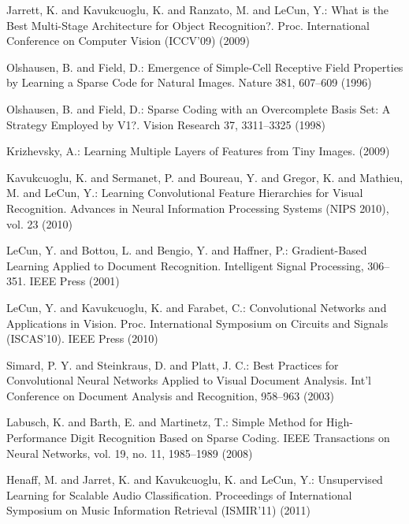 \documentclass[runningheads,a4paper]{llncs}
\begin{document}
\begin{thebibliography}{4}

 Jarrett, K. and Kavukcuoglu, K. and Ranzato, M. and LeCun, Y.: What is the Best Multi-Stage Architecture for Object Recognition?. Proc. International Conference on Computer Vision (ICCV'09) (2009)

 Olshausen, B. and Field, D.: Emergence of Simple-Cell Receptive Field Properties by Learning a Sparse Code for Natural Images. Nature 381, 607--609 (1996)

 Olshausen, B. and Field, D.: Sparse Coding with an Overcomplete Basis Set: A Strategy Employed by V1?. Vision Research 37, 3311--3325 (1998)

 Krizhevsky, A.: Learning Multiple Layers of Features from Tiny Images. (2009)

 Kavukcuoglu, K. and Sermanet, P. and Boureau, Y. and Gregor, K. and Mathieu, M. and LeCun, Y.: Learning Convolutional Feature Hierarchies for Visual Recognition. Advances in Neural Information Processing Systems (NIPS 2010), vol. 23 (2010)

 LeCun, Y. and Bottou, L. and Bengio, Y. and Haffner, P.: Gradient-Based Learning Applied to Document Recognition. Intelligent Signal Processing, 306--351. IEEE Press (2001)

 LeCun, Y. and Kavukcuoglu, K. and Farabet, C.: Convolutional Networks and Applications in Vision. Proc. International Symposium on Circuits and Signals (ISCAS'10). IEEE Press (2010)

 Simard, P. Y. and Steinkraus, D. and Platt, J. C.: Best Practices for Convolutional Neural Networks Applied to Visual Document Analysis. Int'l Conference on Document Analysis and Recognition, 958--963 (2003)

 Labusch, K. and Barth, E. and Martinetz, T.: Simple Method for High-Performance Digit Recognition Based on Sparse Coding. IEEE Transactions on Neural Networks, vol. 19, no. 11, 1985--1989 (2008)

 Henaff, M. and Jarret, K. and Kavukcuoglu, K. and LeCun, Y.: Unsupervised Learning for Scalable Audio Classification. Proceedings of International Symposium on Music Information Retrieval (ISMIR'11) (2011)


\end{thebibliography}
\end{document}
